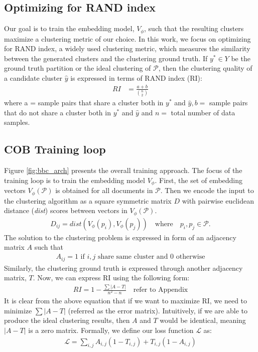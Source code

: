 \documentclass[11pt,a4paper]{article}
\begin{document}
\subsection{Optimizing for RAND index} Our goal is to train the embedding model, $V_\phi$, such that the resulting clusters maximize a clustering metric of our choice. In this work, we focus on optimizing for RAND index, a widely used clustering metric, which measures the similarity between the generated clusters and the clustering ground truth. If $y^* \in Y$ be the ground truth partition or the ideal clustering of $\mathcal{P}$, then the clustering quality of a candidate cluster $\hat{y}$ is expressed in terms of RAND index (RI):
\begin{align*}
RI &= \frac{a+b}{\binom{n}{2}}
\end{align*}
where a = sample pairs that share a cluster both in $y^*$ and $\hat{y}, b=$ sample pairs that do not share a cluster both in $y^*$ and $\hat{y}$ and $n=$ total number of data samples.

\subsection{COB Training loop}
Figure \ref{fig:bbc_arch} presents the overall training approach. The focus of the training loop is to train the embedding model $V_\phi$. First, the set of embedding vectors $V_\phi(\mathcal{P})$ is obtained for all documents in $\mathcal{P}$. Then we encode the input to the clustering algorithm as a square symmetric matrix $D$ with pairwise euclidean distance (\textit{dist}) scores between vectors in $V_\phi(\mathcal{P})$. 
\begin{align*}
D_{ij} = dist(V_\phi(p_i), V_\phi(p_j)) \quad \textrm{where} \quad p_i,p_j \in \mathcal{P}.    
\end{align*}
The solution to the clustering problem is expressed in form of an adjacency matrix $A$ such that
\begin{align*}
A_{ij} = 1 \textrm{ if } i,j \textrm{ share same cluster and } 0 \textrm{ otherwise}    
\end{align*}
Similarly, the clustering ground truth is expressed through another adjacency matrix, $T$. Now, we can express RI using the following form:
\begin{align*}
    RI=1-\frac{\sum |A-T|}{n^2-n} \quad \textrm{refer to Appendix}
\end{align*}
It is clear from the above equation that if we want to maximize RI, we need to minimize $\sum |A-T|$ (referred as the error matrix). Intuitively, if we are able to produce the ideal clustering results, then $A$ and $T$ would be identical, meaning $|A-T|$ is a zero matrix. Formally, we define our loss function $\mathcal{L}$ as:
\begin{align*}
\mathcal{L} = \sum_{i,j} A_{i,j}(1-T_{i,j}) + T_{i,j}(1-A_{i,j})
\end{align*}
\end{document}
